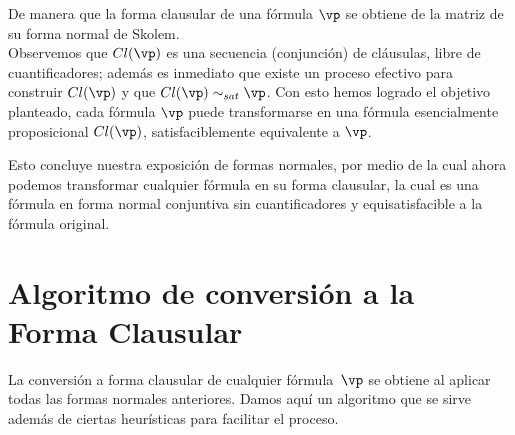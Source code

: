 \documentclass[11pt,letterpaper]{article}
\begin{document}

\noindent De manera que la forma clausular de una fórmula $\vp$ se obtiene de 
la matriz de su forma normal de Skolem.\\
Observemos que $Cl(\vp)$ es una secuencia (conjunción) de cl\'ausulas, libre de
cuantificadores; adem\'as es inmediato que existe un proceso efectivo para
construir $Cl(\vp)$ y que $Cl(\vp)\sim_{sat}\vp$. Con esto hemos logrado el
objetivo planteado, cada f\'ormula $\vp$ puede transformarse en una
f\'ormula esencialmente proposicional $Cl(\vp)$, satisfaciblemente
equivalente a $\vp$.
 



Esto concluye nuestra exposición de formas normales, por medio de la cual
ahora podemos transformar cualquier fórmula en su forma clausular, la cual es
una fórmula en forma normal conjuntiva sin cuantificadores y equisatisfacible
a la fórmula original.


\section{Algoritmo de conversión a la Forma Clausular}

La conversión a forma clausular de cualquier fórmula~$\vp$ se obtiene al 
aplicar todas las formas normales anteriores. 
Damos aquí un algoritmo que se sirve además de ciertas heurísticas para 
facilitar el proceso.
\end{document}
